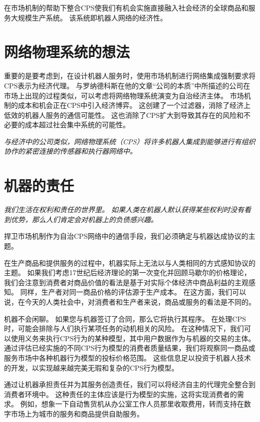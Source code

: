 \documentclass[UTF8]{article}
\begin{document}
在市场机制的帮助下整合CPS使我们有机会实施直接融入社会经济的全球商品和服务大规模生产系统。 该系统即机器人网络的经济性。

\section{网络物理系统的想法}

重要的是要考虑到，在设计机器人服务时，使用市场机制进行网络集成强制要求将CPS表示为经济代理。 与罗纳德科斯在他的文章“公司的本质”中所描述的公司在市场上出现的过程类似，可以考虑将网络物理系统演变为自治经济主体。 市场机制的成本和机会正在CPS中引入经济博弈。 这创建了一个过滤器，消除了经济上低效的机器人服务的通信可能性。 这也消除了CPS扩大到导致其存在的风险和不必要的成本超过社会集中系统的可能性。

\textit{与经济中的公司类似，网络物理系统（CPS）将许多机器人集成到能够进行有组织协作的紧密连接的传感器和执行器网络中。}

\section{机器的责任}

\textit{我们生活在权利和责任的世界里。 如果人类在机器人默认获得某些权利时没有看到优势，那么人们肯定会对机器上的负债感兴趣。}

捍卫市场机制作为自治CPS网络中的通信手段，我们必须确定与机器达成协议的主题。

在生产商品和提供服务的过程中，机器实际上无法以与人类相同的方式感知协议的主题。 如果我们考虑17世纪后经济理论的第一次变化并回顾马歇尔的价格理论，我们会注意到消费者对商品价值的看法是基于对实际个体经济中商品利益的主观感知。 同样，生产者对同一商品价格的评估源于生产成本。 在这方面，我们可以说，在今天的人类社会中，对消费者和生产者来说，商品或服务的看法是不同的。

机器不会闲聊。 如果您与机器签订了合同，那么它将执行其程序。 在处理CPS时，可能会排除与人们执行某项任务的动机相关的风险。 在这种情况下，我们可以使用义务来执行CPS行为的某种模型，其中用户数据作为与机器的交易的主体。 通过评估已经实施的不同CPS行为模型的消费者质量结果，我们将观察同一商品或服务市场中各种机器行为模型的投标价格范围。 这些信息足以投资于机器人技术的开发，以实现越来越完美无瑕和复杂的CPS行为模型。

通过让机器承担责任并为其服务创造责任，我们可以将经济自主的代理完全整合到消费者环境中。 这种责任的主体应该是行为模型的实施，这将实现消费者的需求。 例如，想象一下自动售货机从办公室工作人员那里收取费用，转而支持在数字市场上为城市的服务和商品提供自助服务。
\end{document}
